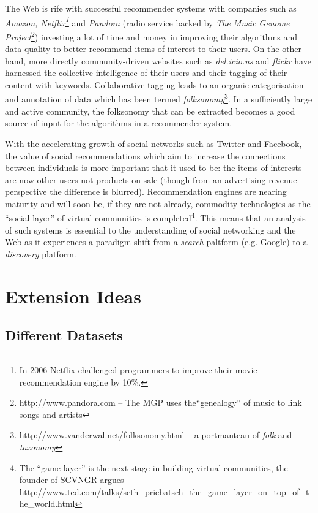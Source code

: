 The Web is rife with successful recommender systems with companies such as \textit{Amazon, Netflix\footnote{In 2006 Netflix challenged programmers to improve their movie recommendation engine by 10\%.}} and \textit{Pandora} (radio service backed by \textit{The Music Genome Project}\footnote{http://www.pandora.com -- The MGP uses the``genealogy'' of music to link songs and artists}) investing a lot of time and money in improving their algorithms and data quality to better recommend items of interest to their users. On the other hand, more directly community-driven websites such as \textit{del.icio.us} and \textit{flickr} have harnessed the collective intelligence of their users and their tagging of their content with keywords. Collaborative tagging leads to an organic categorisation and annotation of data which has been termed \textit{folksonomy}\footnote{http://www.vanderwal.net/folksonomy.html -- a portmanteau of \textit{folk} and \textit{taxonomy} }. In a sufficiently large and active community, the folksonomy that can be extracted becomes a good source of input for the algorithms in a recommender system. 

With the accelerating growth of social networks such as Twitter and Facebook, the value of social recommendations which aim to increase the connections between individuals is more important that it used to be: the items of interests are now other users not products on sale (though from an advertising revenue perspective the difference is blurred). Recommendation engines are nearing maturity and will soon be, if they are not already, commodity technologies as the ``social layer'' of virtual communities is completed\footnote{The ``game layer'' is the next stage in building virtual communities, the founder of SCVNGR argues - http://www.ted.com/talks/seth\_priebatsch\_the\_game\_layer\_on\_top\_of\_the\_world.html}. This means that an analysis of such systems is essential to the understanding of social networking and the Web as it experiences a paradigm shift from a \emph{search} paltform (e.g. Google) to a \emph{discovery} platform.

\section{Extension Ideas}

\subsection*{Different Datasets}

